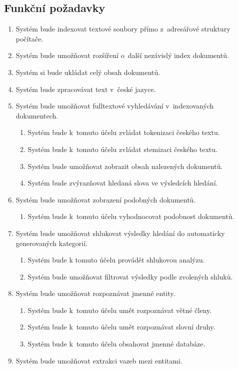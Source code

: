\subsection{Funkční požadavky}
\label{req_0}
\begin{enumerate}
	\item \label{req_00} Systém bude indexovat textové soubory přímo z~adresářové struktury počítače.
	\item \label{req_01} Systém bude umožňovat rozšíření o~další nezávislý index dokumentů.
	\item \label{req_02} Systém si bude ukládat celý obsah dokumentů.
	\item \label{req_03} Systém bude zpracovávat text v~české jazyce.
	\item \label{req_04} Systém bude umožňovat fulltextové vyhledávání v~indexovaných dokumentech.
	\begin{enumerate}
		\item \label{req_040} Systém bude k~tomuto účelu zvládat tokenizaci českého textu.
		\item \label{req_041} Systém bude k~tomuto účelu zvládat stemizaci českého textu.
		\item \label{req_042} Systém bude umožňovat zobrazit obsah nalezených dokumentů.
		\item \label{req_043} Systém bude zvýrazňovat hledaná slova ve výsledcích hledání.
	\end{enumerate}
	\item \label{req_05} Systém bude umožňovat zobrazení podobných dokumentů.
	\begin{enumerate}
		\item \label{req_050} Systém bude k~tomuto účelu vyhodnocovat podobnost dokumentů.
	\end{enumerate}
	\item \label{req_06} Systém bude umožňovat shlukovat výsledky hledání do automaticky generovaných kategorií.
	\begin{enumerate}
		\item \label{req_060} Systém bude k tomuto účelu provádět shlukovou analýzu.
		\item \label{req_061} Systém bude umožňovat filtrovat výsledky podle zvolených shluků.
	\end{enumerate}
	\item \label{req_07} Systém bude umožňovat rozpoznávat jmenné entity.
	\begin{enumerate}
		\item \label{req_070} Systém bude k~tomuto účelu umět rozpoznávat větné členy.
		\item \label{req_071} Systém bude k~tomuto účelu umět rozpoznávat slovní druhy.
		\item \label{req_072} Systém bude k~tomuto účelu obsahovat jmenné databáze.
	\end{enumerate}
	\item \label{req_08} Systém bude umožňovat extrakci vazeb mezi entitami.
\end{enumerate}

